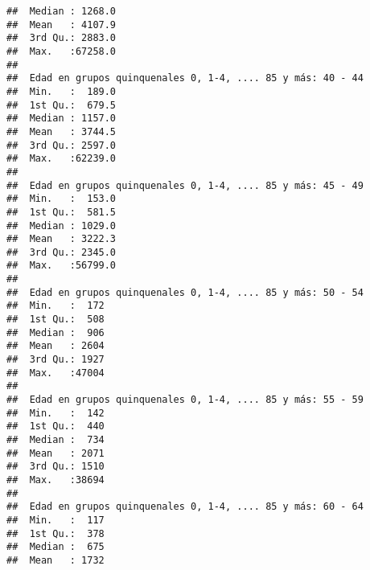 \documentclass[11pt,]{article}
\begin{document}
\begin{verbatim}
##  Median : 1268.0                                           
##  Mean   : 4107.9                                           
##  3rd Qu.: 2883.0                                           
##  Max.   :67258.0                                           
##                                                            
##  Edad en grupos quinquenales 0, 1-4, .... 85 y más: 40 - 44
##  Min.   :  189.0                                           
##  1st Qu.:  679.5                                           
##  Median : 1157.0                                           
##  Mean   : 3744.5                                           
##  3rd Qu.: 2597.0                                           
##  Max.   :62239.0                                           
##                                                            
##  Edad en grupos quinquenales 0, 1-4, .... 85 y más: 45 - 49
##  Min.   :  153.0                                           
##  1st Qu.:  581.5                                           
##  Median : 1029.0                                           
##  Mean   : 3222.3                                           
##  3rd Qu.: 2345.0                                           
##  Max.   :56799.0                                           
##                                                            
##  Edad en grupos quinquenales 0, 1-4, .... 85 y más: 50 - 54
##  Min.   :  172                                             
##  1st Qu.:  508                                             
##  Median :  906                                             
##  Mean   : 2604                                             
##  3rd Qu.: 1927                                             
##  Max.   :47004                                             
##                                                            
##  Edad en grupos quinquenales 0, 1-4, .... 85 y más: 55 - 59
##  Min.   :  142                                             
##  1st Qu.:  440                                             
##  Median :  734                                             
##  Mean   : 2071                                             
##  3rd Qu.: 1510                                             
##  Max.   :38694                                             
##                                                            
##  Edad en grupos quinquenales 0, 1-4, .... 85 y más: 60 - 64
##  Min.   :  117                                             
##  1st Qu.:  378                                             
##  Median :  675                                             
##  Mean   : 1732                                             

\end{verbatim}
\end{document}
